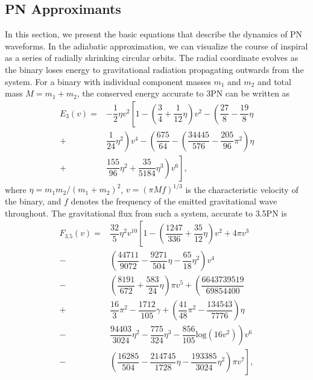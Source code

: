 \documentclass[aps,
prd,
amsmath,
amssymb,
twocolumn,
floatfix,
groupedaddress]{revtex4-1}
\def\l({\left(}
\def\r){\right)}
\begin{document}
\subsection{PN Approximants}\label{sec:level2:PNApproximants}
In this section, we present the basic equations that describe the dynamics of PN waveforms. In the adiabatic approximation, we can visualize the course of inspiral as a series of radially shrinking circular orbits. 
The radial coordinate evolves as the binary loses energy to gravitational radiation propagating outwards from the system.
For a binary with individual component masses $m_1$ and $m_2$ and total mass $M=m_1+m_2$, the conserved energy accurate to 3PN
can be written as
\begin{equation}
\begin{split}\label{eq:E3PN}
E_3(v)=&-\dfrac{1}{2}\eta v^2 \left[1- \l(\dfrac{3}{4}+\dfrac{1}{12}\eta\r)v^2 - \l(\dfrac{27}{8}-\dfrac{19}{8}\eta\right.\right.\\
+&\left.\left.\dfrac{1}{24}\eta^2 \r)v^4 - \l(\dfrac{675}{64}-\l(\dfrac{34445}{576}-\dfrac{205}{96}\pi^2\r)\eta\right.\right.\\
+&\left.\left.\dfrac{155}{96}\eta^2 +\dfrac{35}{5184}\eta^3\r) v^6\right],
\end{split}
\end{equation}
where $\eta=m_1m_2/(m_1+m_2)^2$, $v=(\pi Mf)^{1/3}$ is the characteristic velocity of the binary, and $f$ denotes the frequency of the emitted gravitational wave throughout.
The gravitational flux from such a system, accurate to 3.5PN \citep{FluxandE3-5PN} is
\begin{equation}
\begin{split}\label{eq:Ft3.5PN}
F_{3.5}(v)=&\dfrac{32}{5}\eta^2 v^{10}\left[1 - \l(\dfrac{1247}{336}+\dfrac{35}{12}\eta\r)v^2+4\pi v^3\right.\\
-&\left.\l(\dfrac{44711}{9072}-\dfrac{9271}{504}\eta -\dfrac{65}{18}\eta^2 \r)v^4\right.\\
-&\left.\l(\dfrac{8191}{672}+\dfrac{583}{24}\eta\r)\pi v^5+ \l(\dfrac{6643739519}{69854400}\right.\right.\\
+&\left.\left.\dfrac{16}{3}\pi^2 -\dfrac{1712}{105}\gamma +\l(\dfrac{41}{48}\pi^2 -\dfrac{134543}{7776}\r)\eta \right.\right.\\
-&\left.\left.\dfrac{94403}{3024}\eta^2 -\dfrac{775}{324}\eta^3 -\dfrac{856}{105}\textrm{log}(16v^2)\r)v^6\right.\\ 
-&\left.\l(\dfrac{16285}{504}-\dfrac{214745}{1728}\eta -\dfrac{193385}{3024}\eta^2 \r)\pi v^7\right],
\end{split}
\end{equation}
\end{document}
